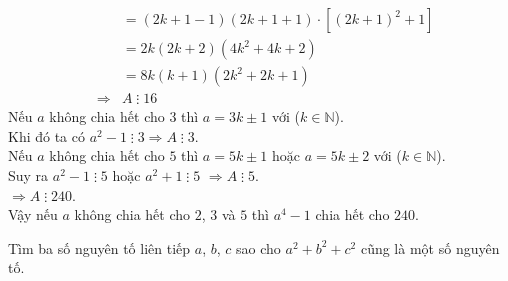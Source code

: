 \begin{bt}
{\begin{enumerate}
\begin{eqnarray*}
				& & = (2k+1-1)(2k+1+1) \cdot \left[ {\left( 2k+1 \right)}^2 + 1 \right] \\
				& & = 2k(2k+2)(4k^2+4k+2) \\
				& & = 8k(k+1)(2k^2+2k+1) \\
				& \Rightarrow & A \; \vdots \; 16
			\end{eqnarray*}
			Nếu $a$ không chia hết cho $3$ thì $a = 3k \pm 1 $ với ($k \in \mathbb{N}$).\\
			Khi đó ta có $a^2-1 \; \vdots \; 3 \Rightarrow A \; \vdots \; 3$.\\
			Nếu $a$ không chia hết cho $5$ thì $a = 5k \pm 1 $ hoặc $a = 5k \pm 2 $ với ($k \in \mathbb{N}$).\\
			Suy ra $a^2-1 \; \vdots \; 5 $ hoặc $a^2+1 \; \vdots \; 5 $
			$\Rightarrow A \; \vdots \; 5 $.\\
			$\Rightarrow A \; \vdots \; 240 $.\\
			Vậy nếu $a$ không chia hết cho $2$, $3$ và $5$ thì $a^4-1$ chia hết cho $240$.
		\end{enumerate}	
	}
\end{bt}

\begin{bt}%
	Tìm ba số nguyên tố liên tiếp $a$, $b$, $c$ sao cho $a^2+b^2+c^2$ cũng là một số nguyên tố.
\end{bt}

